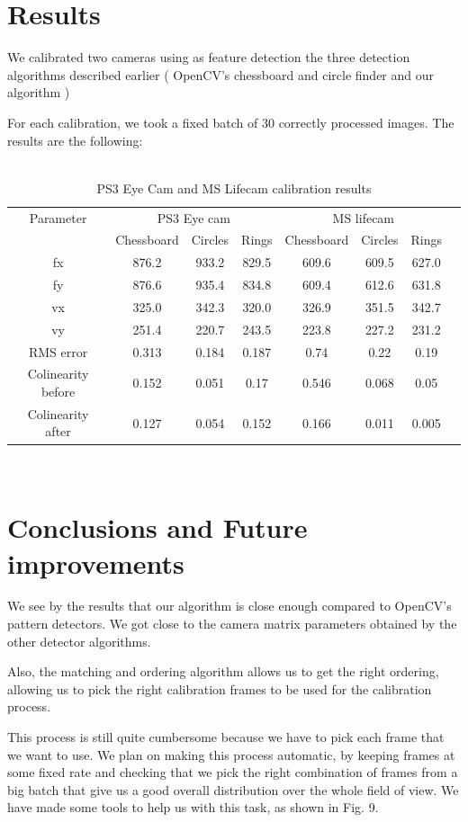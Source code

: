 \documentclass[journal]{IEEEtran}
\begin{document}
\section{Results}
We calibrated two cameras using as feature detection the three detection algorithms described earlier ( OpenCV's chessboard and circle finder and our algorithm )

For each calibration, we took a fixed batch of 30 correctly processed images. The results are the following:
\\
\\
\begin{table}[h]
\centering
\begin{tabular}{ |c||c|c|c|c|c|c|c|  }
 \hline
 Parameter & \multicolumn{3}{c|}{PS3 Eye cam} & \multicolumn{3}{c|}{MS lifecam}\\
 \cline{2-7}
 & Chessboard & Circles & Rings & Chessboard & Circles & Rings \\
 \hline
 fx        & 876.2 & 933.2 & 829.5 & 609.6 & 609.5 & 627.0\\
 fy        & 876.6 & 935.4 & 834.8 & 609.4 & 612.6 & 631.8\\
 vx        & 325.0 & 342.3 & 320.0 & 326.9 & 351.5 & 342.7\\
 vy            & 251.4 & 220.7 & 243.5 & 223.8 & 227.2 & 231.2\\
 RMS error & 0.313 & 0.184 & 0.187 & 0.74 & 0.22 & 0.19\\
 Colinearity before & 0.152 & 0.051 & 0.17 & 0.546 & 0.068 & 0.05\\
 Colinearity after & 0.127 & 0.054 & 0.152 & 0.166 & 0.011 & 0.005\\
 \hline
\end{tabular}
\\
\caption{PS3 Eye Cam and MS Lifecam calibration results}
\end{table}

\section{Conclusions and Future improvements}
We see by the results that our algorithm is close enough compared to OpenCV's pattern detectors. We got close to the camera matrix parameters obtained by the other detector algorithms.

Also, the matching and ordering algorithm allows us to get the right ordering, allowing us to pick the right calibration frames to be used for the calibration process.

This process is still quite cumbersome because we have to pick each frame that we want to use. We plan on making this process automatic, by keeping frames at some fixed rate and checking that we pick the right combination of frames from a big batch that give us a good overall distribution over the whole field of view. We have made some tools to help us with this task, as shown in Fig. 9.
\end{document}
